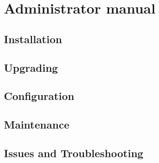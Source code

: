 \chapter{Administrator manual}
\section{Installation}\label{sec:installation}
\section{Upgrading}
\section{Configuration}
\section{Maintenance}
\section{Issues and Troubleshooting}


